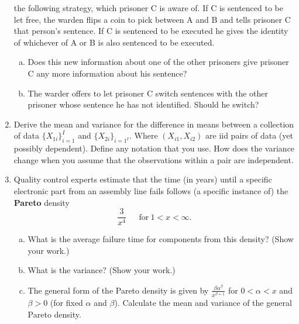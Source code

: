 \documentclass[12pt]{article}
\begin{document}
\begin{enumerate}[1.]
  the following strategy, which prisoner C is aware of.  If C is
  sentenced to be let free, the warden flips a coin to pick between A
  and B and tells prisoner C that person's sentence. If C is sentenced
  to be executed he gives the identity of whichever of A or B is also
  sentenced to be executed.
\begin{enumerate}[a.]
\item Does this new information about one of the other prisoners give
  prisoner C any more information about his sentence?
\item The warder offers to let prisoner C switch sentences with the
  other prisoner whose sentence he has not identified. Should he
  switch?
\end{enumerate}
\item Derive the mean and variance for the difference in means
  between a collection of data $\{X_{1i}\}_{i=1}^I$ and $\{X_{2i}\}_{i=1^I}$.
  Where $(X_{i1}, X_{i2})$ are iid pairs of data (yet possibly dependent).
  Define any notation that you use. How does the variance change
  when you assume that the observations within a pair are independent.
  \item  Quality control experts estimate that the time (in years) until a specific electronic 
    part from an assembly line fails follows (a specific instance of) the {\bf Pareto} density
    $$
    \frac{3}{x^4} ~~~~~~~\mbox{for}~ 1 < x < \infty.
    $$
    \begin{enumerate}[a.]
    \item What is the average failure time for components from this density? (Show your work.)
    \item What is the variance? (Show your work.)
	\item The general form of the Pareto density is given by $\frac{\beta \alpha^\beta}{x^{\beta + 1}}$
for $0 < \alpha < x$ and $\beta > 0$ (for fixed $\alpha$ and $\beta$). Calculate the mean and variance of the general Pareto density.
    \end{enumerate}
\end{enumerate}
\end{document}

